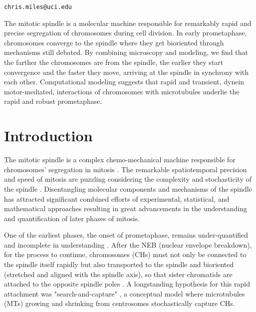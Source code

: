 \documentclass[times, twoside,onecolumn]{zHenriquesLab-StyleBioRxiv}
\begin{document}
\begin{corrauthor}
\texttt{chris.miles@uci.edu}
\end{corrauthor}

\begin{signifstatement}
The mitotic spindle is a molecular machine responsible for remarkably rapid and precise segregation of chromosomes during cell division. In early prometaphase, chromosomes converge to the spindle where they get bioriented through mechanisms still debated. By combining microscopy and modeling, we find that the farther the chromosomes are from the spindle, the earlier they start convergence and the faster they move, arriving at the spindle in synchrony with each other. Computational modeling suggests that rapid and transient, dynein motor-mediated, interactions of chromosomes with microtubules underlie the rapid and robust prometaphase.    
\end{signifstatement}


\section*{Introduction}

The mitotic spindle is a complex chemo-mechanical machine responsible for chromosomes’ segregation in mitosis \cite{prosserMitoticSpindleAssembly2017}. The remarkable spatiotemporal precision and speed of mitosis are puzzling considering the complexity and stochasticity of the spindle \cite{renda2021role}. Disentangling molecular components and mechanisms of the spindle has attracted significant combined efforts of experimental, statistical, and mathematical approaches \cite{nedelec2002computer,mogilner2010towards,redemann2019current,Miles2022} resulting in great advancements in the understanding and quantification of later phases of mitosis. 

One of the earliest phases, the onset of prometaphase, remains under-quantified and incomplete in understanding \cite{ferreira2021prometaphase}. After the NEB (nuclear envelope breakdown), for the process to continue, chromosomes (CHs) must not only be connected to the spindle itself rapidly but also transported to the spindle and bioriented (stretched and aligned with the spindle axis), so that sister chromatids are attached to the opposite spindle poles \cite{mcintoshBiophysicsMitosis2012}. A longstanding hypothesis for this rapid attachment was "search-and-capture" \cite{holy1994dynamic,heald2015thirty}, a conceptual model where microtubules (MTs) growing and shrinking from centrosomes stochastically capture CHs. 
\end{document}
